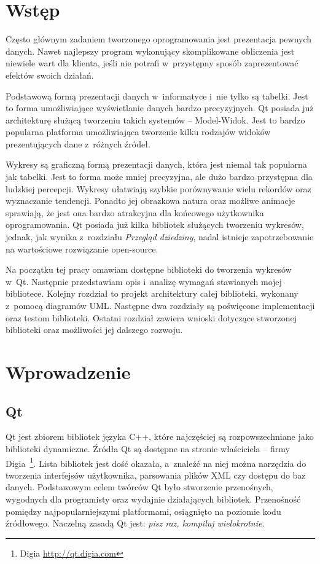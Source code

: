 \chapter*{Wstęp}
Często głównym zadaniem tworzonego oprogramowania jest prezentacja pewnych danych. Nawet najlepszy program wykonujący skomplikowane obliczenia jest niewiele wart dla klienta, jeśli nie potrafi w~przystępny sposób zaprezentować efektów swoich działań.
 
Podstawową formą prezentacji danych w~informatyce i~nie tylko są tabelki. Jest to forma umożliwiające wyświetlanie danych bardzo precyzyjnych. Qt posiada już architekturę służącą tworzeniu takich systemów -- Model-Widok. Jest to bardzo popularna platforma umożliwiająca tworzenie kilku rodzajów widoków prezentujących dane z~różnych źródeł.

Wykresy są graficzną formą prezentacji danych, która jest niemal tak popularna jak tabelki. Jest to forma może mniej precyzyjna, ale dużo bardzo przystępna dla ludzkiej percepcji. Wykresy ułatwiają szybkie porównywanie wielu rekordów oraz wyznaczanie tendencji. Ponadto jej obrazkowa natura oraz możliwe animacje sprawiają, że jest ona bardzo atrakcyjna dla końcowego użytkownika oprogramowania.
Qt posiada już kilka bibliotek służących tworzeniu wykresów, jednak, jak wynika z~rozdziału \textit{Przegląd dziedziny}, nadal istnieje zapotrzebowanie na wartościowe rozwiązanie open-source.

Na początku tej pracy omawiam dostępne biblioteki do tworzenia wykresów w~Qt. Następnie przedstawiam opis i~analizę wymagań stawianych mojej bibliotece. Kolejny rozdział to projekt architektury całej biblioteki, wykonany z~pomocą diagramów UML. Następne dwa rozdziały są poświęcone implementacji oraz testom biblioteki. Ostatni rozdział zawiera wnioski dotyczące stworzonej biblioteki oraz możliwości jej dalszego rozwoju. 

\chapter{Wprowadzenie}
\section{Qt}
Qt jest zbiorem bibliotek języka C++, które najczęściej są rozpowszechniane jako biblioteki dynamiczne. Źródła Qt są dostępne na stronie właściciela -- firmy Digia~\footnote{Digia \url{http://qt.digia.com}}. Lista bibliotek jest dość okazała, a~znaleźć na niej można narzędzia do tworzenia interfejsów użytkownika, parsowania plików XML czy dostępu do baz danych. Podstawowym celem twórców Qt było stworzenie przenośnych, wygodnych dla programisty oraz wydajnie działających bibliotek. Przenośność pomiędzy najpopularniejszymi platformami, osiągnięto na poziomie kodu źródłowego. Naczelną zasadą Qt jest: \textit{pisz raz, kompiluj wielokrotnie}. 

